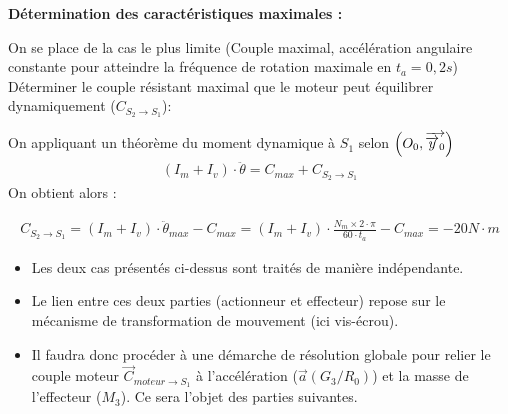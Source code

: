 \documentclass[10pt,fleqn]{article} %
\begin{document}
\begin{multicols}{2}
\begin{exemple}
\textbf{Détermination des caractéristiques maximales : }

On se place de la cas le plus limite (Couple maximal, accélération angulaire constante pour atteindre la fréquence de rotation maximale en $t_a=0,2s$)
Déterminer le couple résistant maximal que le moteur peut équilibrer dynamiquement ($C_{S_2\to S_1}$):

On appliquant un théorème du moment dynamique à $S_1$ selon $\left(O_0,\overrightarrow{\overrightarrow{y}_0}\right)$
\begin{align*}
(I_m+I_v)\cdot \ddot{\theta}=C_{max}+C_{S_2\to S_1}
\end{align*}
On obtient alors : 

\begin{align*}
C_{S_2\to S_1}=(I_m+I_v)\cdot \ddot{\theta}_{max}-C_{max}=(I_m+I_v)\cdot \frac{N_m\times 2\cdot \pi}{60\cdot t_a}-C_{max}=-20N\cdot m
\end{align*}

\end{exemple}


\begin{itemize}
\item Les deux cas présentés ci-dessus sont traités de manière indépendante.
\item Le lien entre ces deux parties (actionneur et effecteur) repose sur le mécanisme de transformation de mouvement (ici vis-écrou).
\item Il faudra donc procéder à une démarche de résolution globale pour relier le couple moteur $\overrightarrow{C}_{moteur\to S_1}$ à l'accélération ($\overrightarrow{a}(G_3/R_0)$) et la masse de l'effecteur ($M_3$). Ce sera l'objet des parties suivantes.
\end{itemize}





\ifprof
\else
\end{multicols}
\fi
\end{document}
